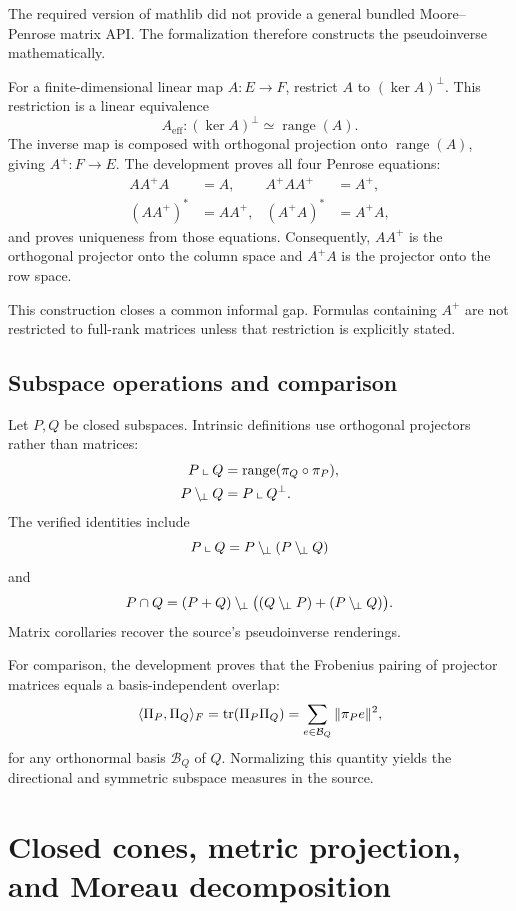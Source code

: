 \documentclass[11pt,a4paper]{article}
\begin{document}
The required version of mathlib did not provide a general bundled
Moore--Penrose matrix API. The formalization therefore constructs the
pseudoinverse mathematically.

For a finite-dimensional linear map \(A:E\to F\), restrict \(A\) to
\((\ker A)^\perp\). This restriction is a linear equivalence
\[
  A_{\mathrm{eff}}:(\ker A)^\perp \simeq \operatorname{range}(A).
\]
The inverse map is composed with orthogonal projection onto
\(\operatorname{range}(A)\), giving \(A^+:F\to E\). The development proves
all four Penrose equations:
\[
\begin{aligned}
  AA^+A&=A, &
  A^+AA^+&=A^+,\\
  (AA^+)^\ast&=AA^+, &
  (A^+A)^\ast&=A^+A,
\end{aligned}
\]
and proves uniqueness from those equations. Consequently, \(AA^+\) is the
orthogonal projector onto the column space and \(A^+A\) is the projector
onto the row space.

This construction closes a common informal gap. Formulas containing
\(A^+\) are not restricted to full-rank matrices unless that restriction is
explicitly stated.

\subsection{Subspace operations and comparison}

Let \(P,Q\) be closed subspaces. Intrinsic definitions use orthogonal
projectors rather than matrices:
\[
\begin{aligned}
  P\mathbin{\llcorner} Q
    &=\operatorname{range}(\pi_Q\circ\pi_P),\\
  P\mathbin{\backslash_{\!\perp}} Q
    &=P\mathbin{\llcorner} Q^\perp.
\end{aligned}
\]
The verified identities include
\[
  P\mathbin{\llcorner} Q=P\mathbin{\backslash_{\!\perp}}(P\mathbin{\backslash_{\!\perp}} Q)
\]
and
\[
  P\cap Q=(P+Q)\mathbin{\backslash_{\!\perp}}\bigl((Q\mathbin{\backslash_{\!\perp}} P)+(P\mathbin{\backslash_{\!\perp}} Q)\bigr).
\]
Matrix corollaries recover the source's pseudoinverse renderings.

For comparison, the development proves that the Frobenius pairing of
projector matrices equals a basis-independent overlap:
\[
  \langle \Pi_P,\Pi_Q\rangle_F
  =\operatorname{tr}(\Pi_P\Pi_Q)
  =\sum_{e\in\mathcal{B}_Q}\|\pi_Pe\|^2,
\]
for any orthonormal basis \(\mathcal{B}_Q\) of \(Q\). Normalizing this
quantity yields the directional and symmetric subspace measures in the
source.

\section{Closed cones, metric projection, and Moreau decomposition}
\label{sec:moreau}
\end{document}
